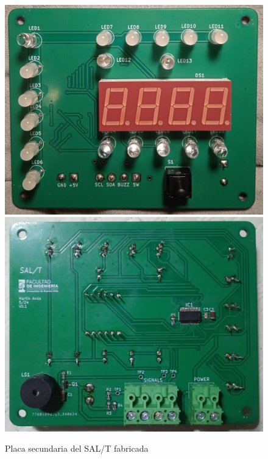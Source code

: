 \begin{figure}[H]
    \centering
    \includegraphics[width = 0.49\linewidth]{img/salt-placa_secundaria-front.jpeg}
    \includegraphics[width = 0.49\linewidth]{img/salt-placa_secundaria-back.jpeg}
    \caption{Placa secundaria del SAL/T fabricada}
    \label{fig:pcb_salt_ihm}
\end{figure}    